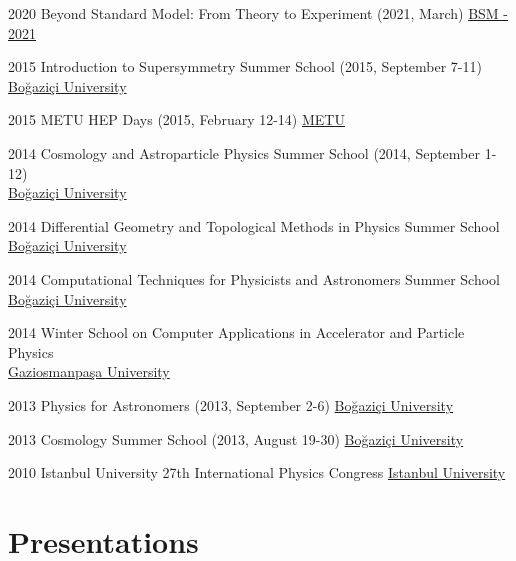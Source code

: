\documentclass[]{friggeri-cv}
\begin{document}
\begin{entrylist}		 	
	\entryp
	{2020}
	{Beyond Standard Model: From Theory to Experiment \normalfont (2021, March)}
	{\href{https://indico.cern.ch/event/959266/}{BSM - 2021}}	
	

	\entryp
	{2015}
	{Introduction to Supersymmetry  Summer School \normalfont (2015, September 7-11)}
	{\href{http://fezagursey.boun.edu.tr/?sayfa=29}{Boğaziçi University}}
	
	\entryp
	{2015}
	{METU HEP Days  \normalfont (2015, February 12-14)}
	{\href{http://yef.ankara.edu.tr/yefgunleri2015/index.html}{METU}}
	
	\entryp
	{2014}
	{Cosmology and Astroparticle Physics Summer School \normalfont (2014, September 1-12) \\}
	{\href{http://fezagursey.boun.edu.tr/?sayfa=33}{Boğaziçi University}}
	
	\entryp
	{2014}
	{Differential Geometry and Topological Methods in Physics Summer School \\}
	{\href{http://fezagursey.boun.edu.tr/?sayfa=32}{Boğaziçi University}}
	
	\entryp
	{2014}
	{Computational Techniques for Physicists and Astronomers Summer School \\}
	{\href{http://fezagursey.boun.edu.tr/?sayfa=31}{Boğaziçi University}}
	
	\entryp
	{2014}
	{Winter School on Computer Applications in Accelerator and Particle Physics \\}
	{\href{http://hpfbu.web.cern.ch/hpfbu/HPFBU2014/HPFBU2014.html}{Gaziosmanpaşa University}}
	
	\entryp
	{2013}
	{Physics for Astronomers \normalfont (2013, September 2-6)}
	{\href{http://fezagursey.boun.edu.tr/?sayfa=36}{Boğaziçi University}}
	
	\entryp
	{2013}
	{Cosmology Summer School \normalfont (2013, August 19-30)}
	{\href{http://fezagursey.boun.edu.tr/?sayfa=35}{Boğaziçi University}}
	
	\entryp
	{2010}
	{Istanbul University 27th International Physics  Congress}
	{\href{http://www.tfd.com.tr/arsiv/TFD/27/Wc9f53756aa549.htm}{Istanbul University}}
	
\end{entrylist}

\newpage

\section{Presentations}
\end{document}
